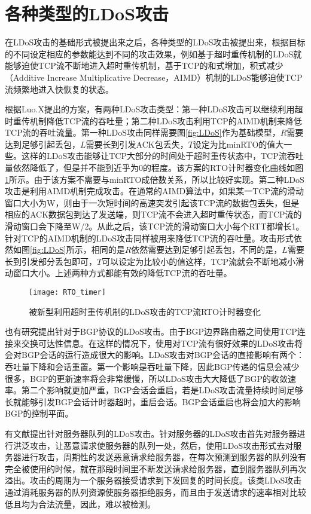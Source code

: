 \section{各种类型的LDoS攻击}
\label{chap3:LDoStypes}
在LDoS攻击的基础形式被提出来之后，各种类型的LDoS攻击被提出来，根据目标的不同设定相应的参数能达到不同的攻击效果，例如基于超时重传机制的LDoS就能够迫使TCP流不断地进入超时重传机制，基于TCP的和式增加，积式减少（Additive Increase Multiplicative Decrease，AIMD）机制的LDoS能够迫使TCP流频繁地进入快恢复的状态。

根据Luo.X\cite{Luo2005OnAN}提出的方案，有两种LDoS攻击类型：第一种LDoS攻击可以继续利用超时重传机制降低TCP流的吞吐量；第二种LDoS攻击利用TCP的AIMD机制来降低TCP流的吞吐流量。第一种LDoS攻击同样需要图\ref{fig:LDoS}作为基础模型，$R$需要达到足够引起丢包，$L$需要长到引发ACK包丢失，$T$设定为比minRTO的值大一些。这样的LDoS攻击能够让TCP大部分的时间处于超时重传状态中，TCP流吞吐量依然降低了，但是并不能到近乎为0的程度。该方案的RTO计时器变化曲线如图\ref{fig:rto-timer-1}所示。由于该方案不需要与minRTO成倍数关系，所以比较好实现。第二种LDoS攻击是利用AIMD机制完成攻击。在通常的AIMD算法中，如果某一TCP流的滑动窗口大小为W，则由于一次短时间的高速突发引起该TCP流的数据包丢失，但是相应的ACK数据包到达了发送端，则TCP流不会进入超时重传状态，而TCP流的滑动窗口会下降至W/2。从此之后，该TCP流的滑动窗口大小每个RTT都增长1。针对TCP的AIMD机制的LDoS攻击同样被用来降低TCP流的吞吐量。攻击形式依然如图\ref{fig:LDoS}所示，相同的是$R$依然需要达到足够引起丢包，不同的是，$L$需要长到引发部分丢包即可，$T$可以设定为比较小的值这样，TCP流就会不断地减小滑动窗口大小。上述两种方式都能有效的降低TCP流的吞吐量。

\begin{figure}
    \centering
    \texttt{[image: RTO\_timer]}
    \caption{被新型利用超时重传机制的LDoS攻击的TCP流RTO计时器变化}
    \label{fig:rto-timer-1}
\end{figure}

也有研究\cite{b2}提出针对于BGP协议的LDoS攻击。由于BGP边界路由器之间使用TCP连接来交换可达性信息。在这样的情况下，使用对TCP流有很好效果的LDoS攻击将会对BGP会话的运行造成很大的影响。LDoS攻击对BGP会话的直接影响有两个：吞吐量下降和会话重置。第一个影响是吞吐量下降，因此BGP传递的信息会减少很多，BGP的更新速率将会非常缓慢，所以LDoS攻击大大降低了BGP的收敛速率。第二个影响就更加严重，BGP会话会重启，若是LDoS攻击流量持续时间足够长就能够引发BGP会话计时器超时，重启会话。BGP会话重启也将会加大的影响BGP的控制平面。

有文献\cite{Maci2007Evaluation}提出针对服务器队列的LDoS攻击。针对服务器的LDoS攻击首先对服务器进行洪泛攻击，让恶意请求使服务器的队列一处，然后，使用LDoS攻击形式去对服务器进行攻击，周期性的发送恶意请求给服务器，在每次预测到服务器的队列没有完全被使用的时候，就在那段时间里不断发送请求给服务器，直到服务器队列再次溢出。攻击的周期为一个服务器接受请求到下发回复的时间长度。该类LDoS攻击通过消耗服务器的队列资源使服务器拒绝服务，而且由于发送请求的速率相对比较低且均为合法流量，因此，难以被检测。

